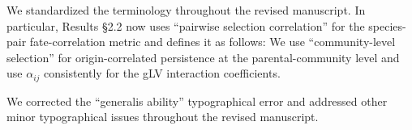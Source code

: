 
\responselabel
We standardized the terminology throughout the revised manuscript. In particular, Results \S2.2 now uses ``pairwise selection correlation'' for the species-pair fate-correlation metric and defines it as follows:
We use ``community-level selection'' for origin-correlated persistence at the parental-community level and use $\alpha_{ij}$ consistently for the gLV interaction coefficients.


\responselabel
We corrected the ``generalis ability'' typographical error and addressed other minor typographical issues throughout the revised manuscript.
